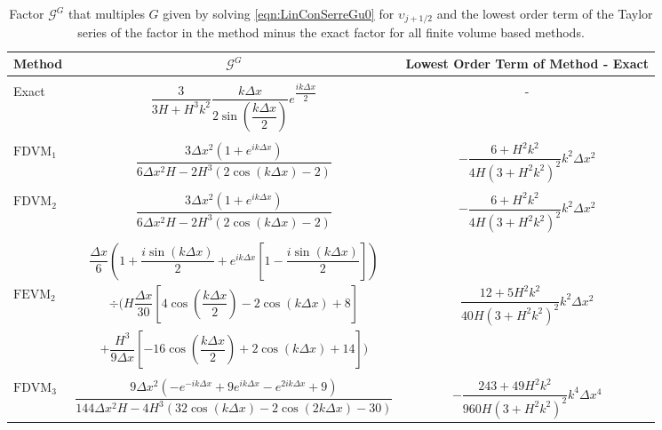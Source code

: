 \begin{landscape}
	\begin{table}
		\centering   
		\begin{tabular}{l  c  c}
			Method& $\mathcal{G}^G$ & Lowest Order Term of Method - Exact \T \\
			\hline \\ 
			Exact &  $\dfrac{3 }{3H + H^3k^2} \dfrac{k\Delta x}{2 \sin\left(\dfrac{k \Delta x}{2}\right)}e^{\dfrac{ik\Delta x}{2}}$ & - \\ \\
			$\text{FDVM}_1$& $\dfrac{3\Delta x^2 \left(1 + e^{ik\Delta x}\right)}{6\Delta x^2 H - 2H^3 \left(2\cos\left(k\Delta x\right) - 2\right)}$ & $-\dfrac{6 +H^2k^2}{4H \left(3 + H^2k^2\right)^2}k^2 \Delta x^2$  \\ \\
			$\text{FDVM}_2$& $\dfrac{3 \Delta x^2 \left({1 + e^{ik\Delta x}}\right)}{6 \Delta x^2 H - 2H^3 \left(2\cos\left(k\Delta x\right) - 2\right)}$ & $-\dfrac{6 +H^2k^2}{4H \left(3 + H^2k^2\right)^2}k^2 \Delta x^2$  \\ \\
			& $\dfrac{\Delta x}{6} \left(1 + \dfrac{i \sin\left(k \Delta x\right)}{2} + e^{ik\Delta x}\left[1 - \dfrac{i \sin\left(k \Delta x\right)}{2}\right] \right)$ & \\  $\text{FEVM}_2$ & $\div  \Bigg( H\dfrac{\Delta x}{30} \left[4\cos\left(\dfrac{k \Delta x}{2}\right) - 2\cos\left({k \Delta x}\right) + 8\right] $  & $\dfrac{12 + 5H^2k^2}{40H \left(3 + H^2k^2\right)^2}k^2 \Delta x^2$ \\ &$+ \dfrac{H^3 }{9\Delta x}\left[-16\cos\left(\dfrac{k\Delta x}{2}\right) + 2 \cos\left(k \Delta x\right) + 14\right]    \Bigg)$ & \\ \\
			$\text{FDVM}_3$&  $\dfrac{9 \Delta x^2 \left({-e^{-ik\Delta x} + 9e^{ik\Delta x} - e^{2ik\Delta x} + 9}\right)}{144 \Delta x^2H - 4H^3\left(32\cos\left(k \Delta x\right) -2\cos\left(2k \Delta x\right) - 30\right)}$ & $-\dfrac{243 + 49H^2k^2}{960H\left(3 + H^2k^2\right)^2}k^4 \Delta x^4$ \T \B \\
			\hline
		\end{tabular}
		\caption{Factor $\mathcal{G}^G$ that multiples $G$ given by solving \eqref{eqn:LinConSerreGu0} for $\upsilon_{j+1/2}$ and the lowest order term of the Taylor series of the factor in the method minus the exact factor for all finite volume based methods.}
		\label{tab:GGfactor} 
	\end{table}
\end{landscape}


